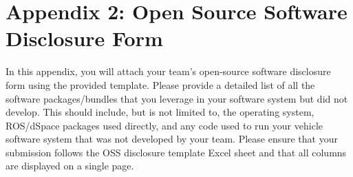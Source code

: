 \documentclass[12pt]{article}
\begin{document}
\section{Appendix 2: Open Source Software Disclosure Form}
In this appendix, you will attach your team's open-source software disclosure form using the provided
template. Please provide a detailed list of all the software packages/bundles that you leverage in your
software system but did not develop. This should include, but is not limited to, the operating system,
ROS/dSpace packages used directly, and any code used to run your vehicle software system that was
not developed by your team.
Please ensure that your submission follows the OSS disclosure template Excel sheet and that all
columns are displayed on a single page.
\end{document}
